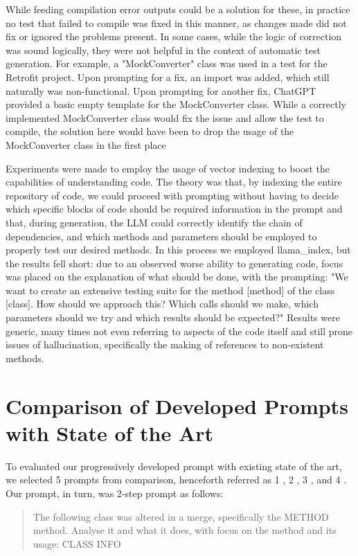 While feeding compilation error outputs could be a solution for these, in practice no test that failed to compile was fixed in this manner, as changes made did not fix or ignored the problems present. In some cases, while the logic of correction was sound logically, they were not helpful in the context of automatic test generation. For example, a "MockConverter" class was used in a test for the Retrofit project. Upon prompting for a fix, an import was added, which still naturally was non-functional. Upon prompting for another fix, ChatGPT provided a basic empty template for the MockConverter class. While a correctly implemented MockConverter class would fix the issue and allow the test to compile, the solution here would have been to drop the usage of the MockConverter class in the first place

Experiments were made to employ the usage of vector indexing to boost the capabilities of understanding code. The theory was that, by indexing the entire repository of code, we could proceed with prompting without having to decide which specific blocks of code should be required information in the prompt and that, during generation, the LLM could correctly identify the chain of dependencies, and which methods and parameters should be employed to properly test our desired methods. In this process we employed llama\_index, but the results fell short: due to an observed worse ability to generating code, focus was placed on the explanation of what should be done, with the prompting: "We want to create an extensive testing suite for the method [method] of the class [class]. How should we approach this? Which calls should we make, which parameters should we try and which results should be expected?"
Results were generic, many times not even referring to aspects of the code itself and still prone issues of hallucination, specifically the making of references to non-existent methods.

\section{Comparison of Developed Prompts with State of the Art}

To evaluated our progressively developed prompt with existing state of the art, we selected 5 prompts from comparison, henceforth referred as 1 \cite{kn:chattester}, 2 \cite{kn:siddiq2023empirical}, 3 \cite{kn:gptunitbra}, and 4 \cite{kn:chatunitest}. Our prompt, in turn, was 2-step prompt as follows:

\begin{quote}
The following class was altered in a merge, specifically the METHOD method. Analyse it and what it does, with focus on the method and its usage: CLASS INFO
\end{quote}

